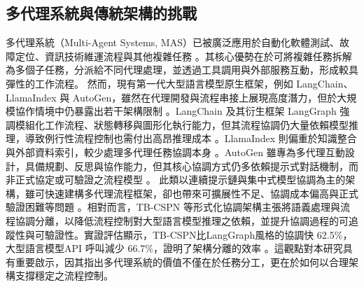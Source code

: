 \begin{ZhChapter}
\subsection{多代理系統與傳統架構的挑戰}
\text 多代理系統（Multi-Agent Systems, MAS）已被廣泛應用於自動化軟體測試、故障定位、資訊技術維運流程與其他複雜任務 \parencite{Borghoff2025Beyond, Bandi2025Rise}。其核心優勢在於可將複雜任務拆解為多個子任務，分派給不同代理處理，並透過工具調用與外部服務互動，形成較具彈性的工作流程。
\text 然而，現有第一代大型語言模型原生框架，例如 LangChain、LlamaIndex 與 AutoGen，雖然在代理開發與流程串接上展現高度潛力，但於大規模協作情境中仍暴露出若干架構限制 \parencite{Borghoff2025Beyond}。LangChain 及其衍生框架 LangGraph 強調模組化工作流程、狀態轉移與圖形化執行能力，但其流程協調仍大量依賴模型推理，導致例行性流程控制也需付出高昂推理成本 \parencite{Ehtesham2025SurveyMCPACPA2AANP, Borghoff2025Beyond}。LlamaIndex 則偏重於知識整合與外部資料索引，較少處理多代理任務協調本身 \parencite{Ehtesham2025SurveyMCPACPA2AANP}。AutoGen 雖專為多代理互動設計，具備規劃、反思與協作能力，但其核心協調方式仍多依賴提示式對話機制，而非正式協定或可驗證之流程模型 \parencite{Borghoff2025Beyond, Bandi2025Rise}。
\text 此類以連續提示鏈與集中式模型協調為主的架構，雖可快速建構多代理流程框架，卻也帶來可擴展性不足、協調成本偏高與正式驗證困難等問題 \parencite{Borghoff2025Beyond}。相對而言，TB-CSPN 等形式化協調架構主張將語義處理與流程協調分離，以降低流程控制對大型語言模型推理之依賴，並提升協調過程的可追蹤性與可驗證性。實證評估顯示，TB-CSPN比LangGraph風格的協調快 62.5\%，大型語言模型API 呼叫減少 66.7\%，證明了架構分離的效率 \parencite{Borghoff2025Beyond}。這觀點對本研究具有重要啟示，因其指出多代理系統的價值不僅在於任務分工，更在於如何以合理架構支撐穩定之流程控制。


\end{ZhChapter}
